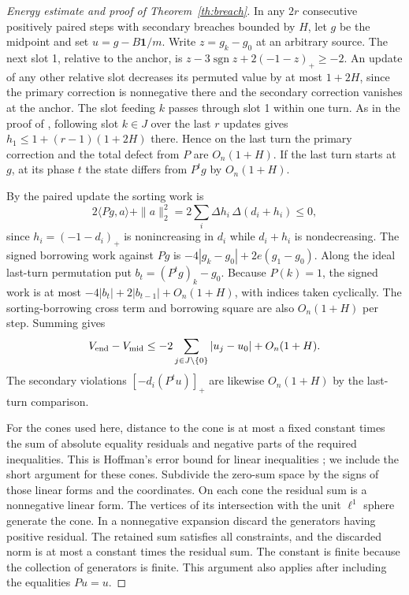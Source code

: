 \documentclass[11pt]{amsart}
\theoremstyle{definition}
\DeclareMathOperator{\sgn}{sgn}
\newcommand{\one}{\mathbf 1}
\begin{document}
\begin{proof}[Energy estimate and proof of Theorem~\ref{th:breach}]
In any \(2r\) consecutive positively paired steps with secondary
breaches bounded by \(H\), let \(g\) be the midpoint and set
\(u=g-B\one/m\). Write \(z=g_k-g_0\) at an arbitrary source.
The next slot 1, relative to the anchor, is
\(z-3\sgn z+2(-1-z)_+\ge-2\).
An update of any other relative slot decreases its permuted value
by at most \(1+2H\), since the primary correction is nonnegative
there and the secondary correction vanishes at the anchor.
The slot feeding \(k\) passes through slot 1 within one turn.
As in the proof of \cite[Theorem~2]{G10}, following slot \(k\in J\)
over the last \(r\) updates gives \(h_1\le1+(r-1)(1+2H)\) there.
Hence on the last turn the primary correction and the total defect
from \(P\) are \(O_n(1+H)\). If the last turn starts at \(g\), at
its phase \(t\) the state differs from \(P^t g\) by \(O_n(1+H)\).

By the paired update the sorting work is
\[
 2\langle Pg,a\rangle+\|a\|_2^2
   =2\sum_i\Delta h_i\,\Delta(d_i+h_i)\le0,
\]
since \(h_i=(-1-d_i)_+\) is nonincreasing in \(d_i\) while
\(d_i+h_i\) is nondecreasing. The signed borrowing work against
\(Pg\) is \(-4|g_k-g_0|+2e(g_1-g_0)\).
Along the ideal last-turn permutation put \(b_t=(P^tg)_k-g_0\).
Because \(P(k)=1\), the signed work is at most
\(-4|b_t|+2|b_{t-1}|+O_n(1+H)\), with indices taken cyclically.
The sorting-borrowing cross term and borrowing square are also
\(O_n(1+H)\) per step. Summing gives
\begin{equation}\label{eq:work}
 V_{\rm end}-V_{\rm mid}\le -2\sum_{j\in J\setminus\{0\}}
 |u_j-u_0|+O_n(1+H).
\end{equation}
The secondary violations \([-d_i(P^tu)]_+\) are likewise
\(O_n(1+H)\) by the last-turn comparison.

For the cones used here, distance to the cone is at most a fixed
constant times the sum of absolute equality residuals and negative
parts of the required inequalities. This is Hoffman's error bound for
linear inequalities \cite{Hoffman52}; we include the short argument for
these cones. Subdivide the
zero-sum space by the signs of those linear forms and the coordinates.
On each cone the residual sum is a nonnegative linear form. The
vertices of its intersection with the unit \(\ell^1\) sphere
generate the cone. In a nonnegative expansion discard the generators
having positive residual. The retained sum satisfies all constraints,
and the discarded norm is at most a constant times the residual sum.
The constant is finite because the collection of generators is finite.
This argument also applies after including the equalities \(Pu=u\).


\end{proof}
\end{document}
